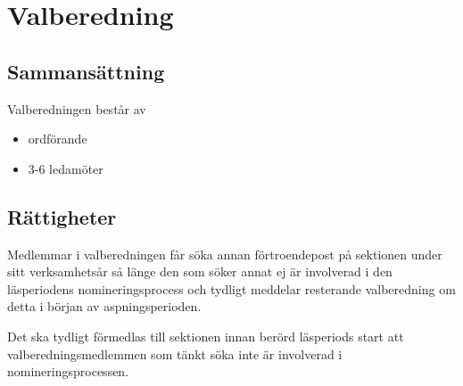 \section{Valberedning}
 
\subsection{Sammansättning}
Valberedningen består av
\begin{itemize}
	\item ordförande
	\item 3-6 ledamöter
\end{itemize}

\subsection{Rättigheter}
Medlemmar i valberedningen får söka annan förtroendepost på sektionen under sitt verksamhetsår så länge den som söker annat ej är involverad i den läsperiodens nomineringsprocess och tydligt meddelar resterande valberedning om detta i början av aspningsperioden.

 Det ska tydligt förmedlas till sektionen innan berörd läsperiods start att valberedningsmedlemmen som tänkt söka inte är involverad i nomineringsprocessen.